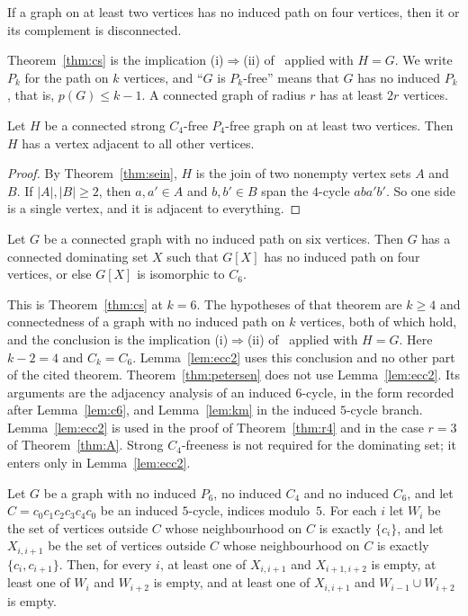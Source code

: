 \documentclass[ASNA]{USG}
\theoremstyle{WBstyletwo}
\numberwithin{equation}{section}
\newcommand{\pp}{p}
\begin{document}
\begin{theorem}\label{thm:sein}
If a graph on at least two vertices has no induced path on four vertices, then it or its complement is disconnected.
\end{theorem}

Theorem~\ref{thm:cs} is the implication (i)$\Rightarrow$(ii) of~\cite[Theorem~5]{cs} applied with $H=G$. We write $P_k$ for the path on $k$ vertices, and ``$G$ is $P_k$-free'' means that $G$ has no induced $P_k$, that is, $\pp(G)\le k-1$. A connected graph of radius $r$ has at least $2r$ vertices.

\begin{lemma}\label{lem:join}
Let $H$ be a connected strong $C_4$-free $P_4$-free graph on at least two vertices. Then $H$ has a vertex adjacent to all other vertices.
\end{lemma}

\begin{proof}
By Theorem~\ref{thm:sein}, $H$ is the join of two nonempty vertex sets $A$ and $B$. If $|A|,|B|\ge 2$, then $a,a'\in A$ and $b,b'\in B$ span the $4$-cycle $aba'b'$. So one side is a single vertex, and it is adjacent to everything.
\end{proof}

\begin{lemma}\label{lem:cs6}
Let $G$ be a connected graph with no induced path on six vertices. Then $G$ has a connected dominating set $X$ such that $G[X]$ has no induced path on four vertices, or else $G[X]$ is isomorphic to $C_6$.
\end{lemma}

This is Theorem~\ref{thm:cs} at $k=6$. The hypotheses of that theorem are $k\ge 4$ and connectedness of a graph with no induced path on $k$ vertices, both of which hold, and the conclusion is the implication (i)$\Rightarrow$(ii) of~\cite[Theorem~5]{cs} applied with $H=G$. Here $k-2=4$ and $C_k=C_6$. Lemma~\ref{lem:ecc2} uses this conclusion and no other part of the cited theorem. Theorem~\ref{thm:petersen} does not use Lemma~\ref{lem:ecc2}. Its arguments are the adjacency analysis of an induced $6$-cycle, in the form recorded after Lemma~\ref{lem:c6}, and Lemma~\ref{lem:km} in the induced $5$-cycle branch. Lemma~\ref{lem:ecc2} is used in the proof of Theorem~\ref{thm:r4} and in the case $r=3$ of Theorem~\ref{thm:A}. Strong $C_4$-freeness is not required for the dominating set; it enters only in Lemma~\ref{lem:ecc2}.

\begin{lemma}\label{lem:km}
Let $G$ be a graph with no induced $P_6$, no induced $C_4$ and no induced $C_6$, and let $C=c_0c_1c_2c_3c_4c_0$ be an induced $5$-cycle, indices modulo~$5$. For each $i$ let $W_i$ be the set of vertices outside $C$ whose neighbourhood on $C$ is exactly $\{c_i\}$, and let $X_{i,i+1}$ be the set of vertices outside $C$ whose neighbourhood on $C$ is exactly $\{c_i,c_{i+1}\}$. Then, for every $i$, at least one of $X_{i,i+1}$ and $X_{i+1,i+2}$ is empty, at least one of $W_i$ and $W_{i+2}$ is empty, and at least one of $X_{i,i+1}$ and $W_{i-1}\cup W_{i+2}$ is empty.
\end{lemma}
\end{document}
